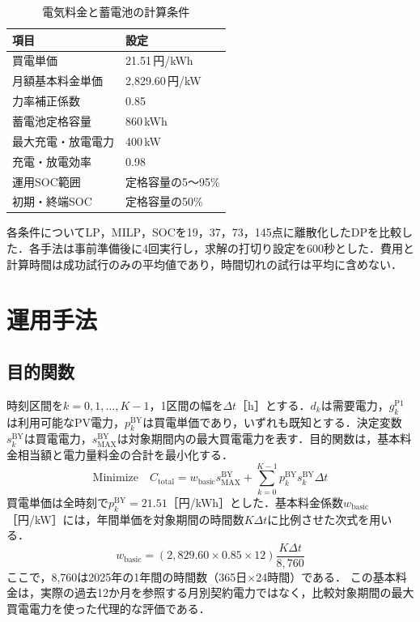 \documentclass[a4paper,11pt,xelatex,ja=standard]{bxjsarticle}
\begin{document}
\begin{table}[H]
    \centering
    \small
    \caption{電気料金と蓄電池の計算条件}
    \label{tab:system-conditions}
    \begin{tabular}{p{46mm}p{91mm}}
        \toprule
        項目        & 設定             \\
        \midrule
        買電単価      & 21.51\,円/kWh   \\
        月額基本料金単価  & 2,829.60\,円/kW \\
        力率補正係数    & 0.85           \\
        蓄電池定格容量   & 860\,kWh       \\
        最大充電・放電電力 & 400\,kW        \\
        充電・放電効率   & 0.98           \\
        運用SOC範囲   & 定格容量の5～95\%    \\
        初期・終端SOC  & 定格容量の50\%      \\
        \bottomrule
    \end{tabular}
\end{table}


各条件についてLP，MILP，SOCを19，37，73，145点に離散化したDPを比較した．各手法は事前準備後に4回実行し，求解の打切り設定を600秒とした．費用と計算時間は成功試行のみの平均値であり，時間切れの試行は平均に含めない．

\clearpage
\begingroup
\small
\section{運用手法}
\subsection{目的関数}
時刻区間を$k=0,1,\ldots,K-1$，1区間の幅を$\Delta t$［h］とする．$d_k$は需要電力，$g^{\mathrm{P1}}_k$は利用可能なPV電力，$p^{\mathrm{BY}}_k$は買電単価であり，いずれも既知とする．決定変数$s^{\mathrm{BY}}_k$は買電電力，$s^{\mathrm{BY}}_{\mathrm{MAX}}$は対象期間内の最大買電電力を表す．目的関数は，基本料金相当額と電力量料金の合計を最小化する．
\begin{equation}
    \text{Minimize}\quad C_{\mathrm{total}}
    = w_{\mathrm{basic}}s^{\mathrm{BY}}_{\mathrm{MAX}}
    + \sum_{k=0}^{K-1}p^{\mathrm{BY}}_k s^{\mathrm{BY}}_k\Delta t
    \label{eq:objective}
\end{equation}
買電単価は全時刻で$p^{\mathrm{BY}}_k=21.51$［円/kWh］とした．基本料金係数$w_{\mathrm{basic}}$［円/kW］には，年間単価を対象期間の時間数$K\Delta t$に比例させた次式を用いる．
\begin{equation}
    w_{\mathrm{basic}}
    = (2{,}829.60\times0.85\times12)
    \frac{K\Delta t}{8{,}760}
    \label{eq:basic-weight}
\end{equation}
ここで，8,760は2025年の1年間の時間数（365日$\times$24時間）である．
この基本料金は，実際の過去12か月を参照する月別契約電力ではなく，比較対象期間の最大買電電力を使った代理的な評価である．
\end{document}
